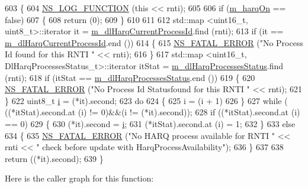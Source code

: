 \begin{DoxyCode}
603 \{
604   \hyperlink{log-macros-disabled_8h_a90b90d5bad1f39cb1b64923ea94c0761}{NS\_LOG\_FUNCTION} (\textcolor{keyword}{this} << rnti);
605 
606   \textcolor{keywordflow}{if} (\hyperlink{classns3_1_1PssFfMacScheduler_a7163e6149892abe4c17ce95be6bf1953}{m\_harqOn} == \textcolor{keyword}{false})
607     \{
608       \textcolor{keywordflow}{return} (0);
609     \}
610 
611 
612   std::map <uint16\_t, uint8\_t>::iterator it = \hyperlink{classns3_1_1PssFfMacScheduler_a860dc1e5d114893e493e5ff2696d7171}{m\_dlHarqCurrentProcessId}.find (rnti);
613   \textcolor{keywordflow}{if} (it == \hyperlink{classns3_1_1PssFfMacScheduler_a860dc1e5d114893e493e5ff2696d7171}{m\_dlHarqCurrentProcessId}.end ())
614     \{
615       \hyperlink{group__fatal_ga5131d5e3f75d7d4cbfd706ac456fdc85}{NS\_FATAL\_ERROR} (\textcolor{stringliteral}{"No Process Id found for this RNTI "} << rnti);
616     \}
617   std::map <uint16\_t, DlHarqProcessesStatus\_t>::iterator itStat = 
      \hyperlink{classns3_1_1PssFfMacScheduler_aaddeb3fa864cb82b5829d4ca1cf9abea}{m\_dlHarqProcessesStatus}.find (rnti);
618   \textcolor{keywordflow}{if} (itStat == \hyperlink{classns3_1_1PssFfMacScheduler_aaddeb3fa864cb82b5829d4ca1cf9abea}{m\_dlHarqProcessesStatus}.end ())
619     \{
620       \hyperlink{group__fatal_ga5131d5e3f75d7d4cbfd706ac456fdc85}{NS\_FATAL\_ERROR} (\textcolor{stringliteral}{"No Process Id Statusfound for this RNTI "} << rnti);
621     \}
622   uint8\_t \hyperlink{bernuolliDistribution_8m_a6f6ccfcf58b31cb6412107d9d5281426}{i} = (*it).second;
623   \textcolor{keywordflow}{do}
624     \{
625       i = (i + 1) %
626     \}
627   \textcolor{keywordflow}{while} ( ((*itStat).second.at (i) != 0)&&(i != (*it).second));
628   \textcolor{keywordflow}{if} ((*itStat).second.at (i) == 0)
629     \{
630       (*it).second = \hyperlink{bernuolliDistribution_8m_a6f6ccfcf58b31cb6412107d9d5281426}{i};
631       (*itStat).second.at (i) = 1;
632     \}
633   \textcolor{keywordflow}{else}
634     \{
635       \hyperlink{group__fatal_ga5131d5e3f75d7d4cbfd706ac456fdc85}{NS\_FATAL\_ERROR} (\textcolor{stringliteral}{"No HARQ process available for RNTI "} << rnti << \textcolor{stringliteral}{" check before update
       with HarqProcessAvailability"});
636     \}
637 
638   \textcolor{keywordflow}{return} ((*it).second);
639 \}
\end{DoxyCode}


Here is the caller graph for this function\+:


